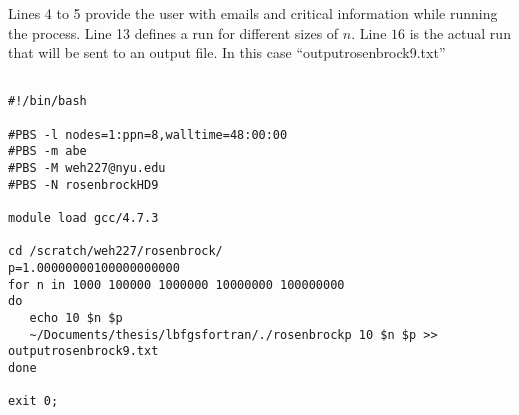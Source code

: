 Lines 4 to 5 provide the user with emails and critical information while running the process. Line 13 defines a run for different sizes of $n$. Line $16$ is the actual run that will be sent to an output file. In this case ``outputrosenbrock9.txt''
\lstset{
  language=sh,
  firstnumber = 1
}

\begin{lstlisting}

#!/bin/bash

#PBS -l nodes=1:ppn=8,walltime=48:00:00
#PBS -m abe
#PBS -M weh227@nyu.edu
#PBS -N rosenbrockHD9

module load gcc/4.7.3

cd /scratch/weh227/rosenbrock/
p=1.00000000100000000000
for n in 1000 100000 1000000 10000000 100000000
do
   echo 10 $n $p
   ~/Documents/thesis/lbfgsfortran/./rosenbrockp 10 $n $p >> outputrosenbrock9.txt
done

exit 0;



\end{lstlisting}
